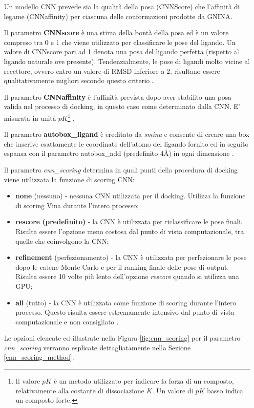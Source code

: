 Un modello CNN prevede sia la qualità della posa (CNNScore) che l'affinità di legame (CNNaffinity) per ciascuna delle conformazioni prodotte da GNINA. 

Il parametro \textbf{CNNscore} è una stima della bontà della posa ed è un valore compreso tra 0 e 1 che viene utilizzato per classificare le pose del ligando. Un valore di CNNscore pari ad 1 denota una posa del ligando perfetta (rispetto al ligando naturale ove presente). Tendenzialmente, le pose di ligandi molto vicine al recettore, ovvero entro un valore di RMSD inferiore a 2, risultano essere qualitativamente migliori secondo questo criterio \cite{mcnutt_gnina_2021}.

Il parametro \textbf{CNNaffinity} è l'affinità prevista dopo aver stabilito una posa valida nel processo di docking, in questo caso come determinato dalla CNN. E' misurata in unità \(pK\)\footnote{Il valore \(pK\) è un metodo utilizzato per indicare la forza di un composto, relativamente alla costante di dissociazione \(K\).
Un valore di \(pK\) basso indica un composto forte.} \cite{mcnutt_gnina_2021}.

Il parametro \textbf{autobox\_ligand} è ereditato da \textit{smina} e consente di creare una box che inscrive esattamente le coordinate dell'atomo del ligando fornito ed in seguito espansa con il parametro autobox\_add (predefinito 4Å) in ogni dimensione \cite{mcnutt_gnina_2021}.

Il parametro \textit{cnn\_scoring} determina in quali punti della procedura di docking viene utilizzata la funzione di scoring CNN:
\begin{itemize}
    \item \textbf{none} (nessuno) - nessuna CNN utilizzata per il docking. Utilizza la funzione di scoring Vina durante l'intero processo;
    \item \textbf{rescore (predefinito)} - la CNN è utilizzata per riclassificare le pose finali. Risulta essere l'opzione meno costosa dal punto di vista computazionale, tra quelle che coinvolgono la CNN;
    \item \textbf{refinement} (perfezionamento) - la CNN è utilizzata per perfezionare le pose dopo le catene Monte Carlo e per il ranking finale delle pose di output. Risulta essere 10 volte più lento dell'opzione \textit{rescore} quando si utilizza una GPU;
    \item \textbf{all} (tutto) - la CNN è utilizzata come funzione di scoring durante l'intero processo. Questo risulta essere estremamente intensivo dal punto di vista computazionale e non consigliato \cite{mcnutt_gnina_2021}.
\end{itemize}
Le opzioni elencate ed illustrate nella Figura \ref{fig:cnn_scoring} per il parametro \textit{cnn\_scoring} verranno esplicate dettagliatamente nella Sezione \ref{cnn_scoring_method}.

